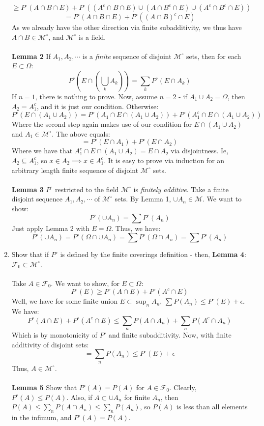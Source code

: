 \documentclass[12pt,a4paper]{article}
\newcommand{\1}[1]{\mathbbm{1}\left\{ #1 \right\}}
\newcommand{\fcal}{\mathcal{F}}
\newcommand{\mcal}{\mathcal{M}}
\begin{document}
\begin{enumerate}
	$$
		\geq 
		P^\circ(A \cap B \cap E) + P^\circ((A^c \cap B \cap E) \cup (A \cap B^c \cap E) \cup (A^c \cap B^c \cap E))
	$$
	$$
		= 
		P^\circ(A \cap B \cap E) + P^\circ((A \cap B)^c \cap E)
	$$
	As we already have the other direction via finite subadditivity, we thus have $A \cap B \in \mcal^\circ$, and $\mcal^\circ$ is a field.
	\\\\
	\textbf{Lemma 2} If $A_1, A_2, \cdots$ is a \textit{finite} sequence of disjoint $\mcal^\circ$ sets, then for each $E \subset \Omega$:
	$$
		P^\circ\left(E \cap \left(\bigcup_k A_k\right)\right) =
		\sum_k P^\circ (E \cap A_k)
	$$
	If $n = 1$, there is nothing to prove. Now, assume $n = 2$ - if $A_1 \cup A_2 = \Omega$, then $A_2 = A_1^c$, and it is just our condition. Otherwise:
	$$
		P^\circ(E \cap (A_1 \cup A_2)) = 
		P^\circ(A_1 \cap E \cap (A_1 \cup A_2)) +
		P^\circ(A_1^c \cap E \cap (A_1 \cup A_2))
	$$
	Where the second step again makes use of our condition for $E \cap (A_1 \cup A_2)$ and $A_1 \in \mcal^\circ$. The above equals:
	$$
		=
		P^\circ(E \cap A_1) +
		P^\circ(E \cap A_2)
	$$
	Where we have that $A_1^c \cap E \cap (A_1 \cup A_2) = E \cap A_2$ via disjointness. Ie, $A_2 \subseteq A_1^c$, so $x \in A_2 \implies x \in A_1^c$. It is easy to prove via induction for an arbitrary length finite sequence of disjoint $\mcal^\circ$ sets.
	\\\\
	\textbf{Lemma 3} $P^\circ$ restricted to the field $\mcal^\circ$ is \textit{finitely additive}. Take a finite disjoint sequence $A_1, A_2, \cdots$ of $\mcal^\circ$ sets. By Lemma 1, $\cup A_n \in \mcal$. We want to show:
	$$
		P^\circ(\cup A_n) = \sum P^\circ(A_n)
	$$
	Just apply Lemma 2 with $E = \Omega$. Thus, we have:
	$$
		P^\circ(\cup A_n) = P^\circ(\Omega \cap \cup A_n) = \sum P^\circ(\Omega \cap A_n) = \sum P^\circ(A_n)
	$$
	
	\item Show that if $P^\circ$ is defined by the finite coverings definition - then, \textbf{Lemma 4}: $\fcal_0 \subset \mcal^\circ$.
	\\\\
	Take $A \in \fcal_0$. We want to show, for $E \subset \Omega$:
	$$
		P^\circ(E) \geq P^\circ(A \cap E) + P^\circ(A^c \cap E)
	$$
	Well, we have for some finite union $E \subset \sup_n A_n$, $\sum P(A_n) \leq P^\circ(E) + \epsilon$. We have:
	$$
		P^\circ(A \cap E) + P^\circ(A^c \cap E) \leq
		\sum_n P(A \cap A_n) + \sum_n P(A^c \cap A_n)
	$$
	Which is by monotonicity of $P^\circ$ and finite subadditivity. Now, with finite additivity of disjoint sets:
	$$
		= \sum_n P(A_n) \leq P^\circ(E) + \epsilon
	$$
	Thus, $A \in \mcal^\circ$.
	\\\\
	\textbf{Lemma 5} Show that $P^\circ(A) = P(A)$ for $A \in \fcal_0$. Clearly, $P^\circ(A) \leq P(A)$. Also, if $A \subset \cup A_n$ for finite $A_n$, then $P(A) \leq \sum_n P(A \cap A_n) \leq \sum_n P(A_n)$, so $P(A)$ is less than all elements in the infimum, and $P^\circ(A) = P(A)$. 
	

\end{enumerate}
\end{document}
